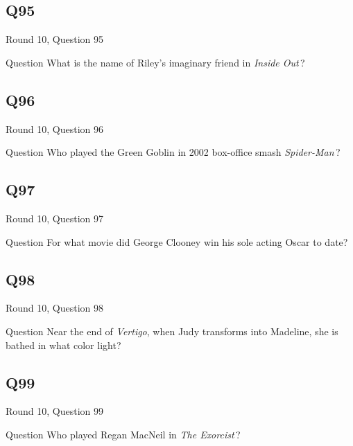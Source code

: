 \documentclass[11pt]{beamer}
\begin{document}
\subsection*{Q95}
\begin{frame}[t]{Round 10, Question 95}
\vspace{2em}
\begin{block}{Question}
What is the name of Riley's imaginary friend in \emph{Inside Out}\,?
\end{block}
\end{frame}
    

\subsection*{Q96}
\begin{frame}[t]{Round 10, Question 96}
\vspace{2em}
\begin{block}{Question}
Who played the Green Goblin in 2002 box-office smash \emph{Spider-Man}\,?
\end{block}
\end{frame}
    

\subsection*{Q97}
\begin{frame}[t]{Round 10, Question 97}
\vspace{2em}
\begin{block}{Question}
For what movie did George Clooney win his sole acting Oscar to date?
\end{block}
\end{frame}
    

\subsection*{Q98}
\begin{frame}[t]{Round 10, Question 98}
\vspace{2em}
\begin{block}{Question}
Near the end of \emph{Vertigo}, when Judy transforms into Madeline, she is bathed in what color light?
\end{block}
\end{frame}
    

\subsection*{Q99}
\begin{frame}[t]{Round 10, Question 99}
\vspace{2em}
\begin{block}{Question}
Who played Regan MacNeil in \emph{The Exorcist}\,?
\end{block}
\end{frame}
    
\end{document}
